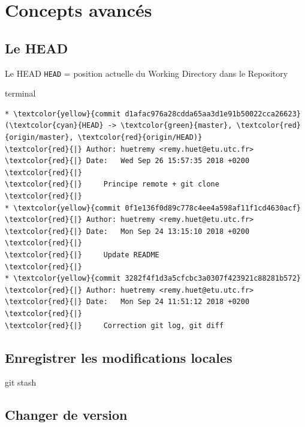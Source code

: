 \documentclass[usepdftitle=false]{beamer}
\begin{document}
\section{Concepts avancés}

\subsection{Le HEAD}

\begin{frame}[fragile]{Le HEAD}
		\verb+HEAD+ = position actuelle du Working Directory dans le Repository

	\begin{beamercolorbox}[rounded=true,shadow=true]{terminal}
\begin{Verbatim}
* \textcolor{yellow}{commit d1afac976a28cdda65aa3d1e91b50022cca26623} (\textcolor{cyan}{HEAD} -> \textcolor{green}{master}, \textcolor{red}{origin/master}, \textcolor{red}{origin/HEAD)}
\textcolor{red}{|} Author: huetremy <remy.huet@etu.utc.fr>
\textcolor{red}{|} Date:   Wed Sep 26 15:57:35 2018 +0200
\textcolor{red}{|}
\textcolor{red}{|}     Principe remote + git clone
\textcolor{red}{|}
* \textcolor{yellow}{commit 0f1e136f0d89c778c4ee4a598af11f1cd4630acf}
\textcolor{red}{|} Author: huetremy <remy.huet@etu.utc.fr>
\textcolor{red}{|} Date:   Mon Sep 24 13:15:10 2018 +0200
\textcolor{red}{|}
\textcolor{red}{|}     Update README
\textcolor{red}{|}
* \textcolor{yellow}{commit 3282f4f1d3a5cfcbc3a0307f423921c88281b572}
\textcolor{red}{|} Author: huetremy <remy.huet@etu.utc.fr>
\textcolor{red}{|} Date:   Mon Sep 24 11:51:12 2018 +0200
\textcolor{red}{|}
\textcolor{red}{|}     Correction git log, git diff
\end{Verbatim}
	\end{beamercolorbox}
\end{frame}

\subsection{Enregistrer les modifications locales}

\begin{frame}{git stash}
\end{frame}

\subsection{Changer de version}
\end{document}
